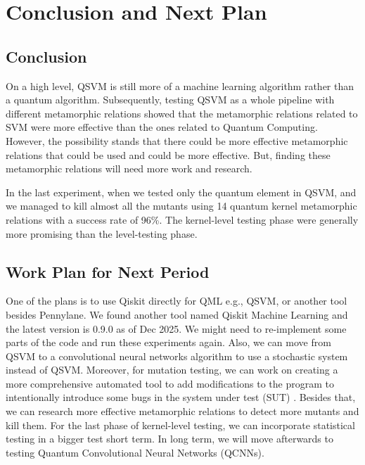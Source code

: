 \documentclass[12pt,a4paper]{article}
\begin{document}
	\section{Conclusion and Next Plan}
	\label{sec:conclusion}
	
	\subsection{Conclusion}
	
	On a high level, QSVM is still more of a machine learning algorithm rather than a quantum algorithm. Subsequently, testing QSVM as a whole pipeline with different metamorphic relations showed that the metamorphic relations related to SVM were more effective than the ones related to Quantum Computing. However, the possibility stands that there could be more effective metamorphic relations that could be used and could be more effective. But, finding these metamorphic relations will need more work and research. 
	
	In the last experiment, when we tested only the quantum element in QSVM, and we managed to kill almost all the mutants using 14 quantum kernel metamorphic relations with a success rate of 96\%. The kernel-level testing phase were generally more promising than the level-testing phase.
	
	\subsection{Work Plan for Next Period}
	\label{sec:next-plan}
	
	One of the plans is to use Qiskit directly for QML e.g., QSVM, or another tool besides Pennylane. We found another tool named Qiskit Machine Learning and the latest version is 0.9.0 as of Dec 2025. We might need to re-implement some parts of the code and run these experiments again.  Also, we can move from QSVM to a convolutional neural networks algorithm to use a stochastic system instead of QSVM. Moreover, for mutation testing, we can work on creating a more comprehensive automated tool to add modifications to the program to intentionally introduce some bugs in the system under test (SUT) \cite{qMutphyFortunato}. Besides that, we can research more effective metamorphic relations to detect more mutants and kill them. For the last phase of kernel-level testing, we can incorporate statistical testing in a bigger test short term. In long term, we will move afterwards to testing Quantum Convolutional Neural Networks (QCNNs). 
	
\end{document}
